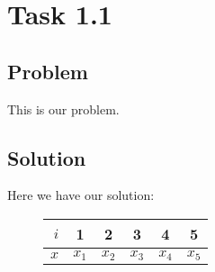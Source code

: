 \section*{Task 1.1}
\subsection*{Problem}
This is our problem.

\subsection*{Solution}
Here we have our solution:

\begin{figure}[H]
	\centering
	\begin{tabular}{ r | c c c c c}
		$i$ & 1 & 2 & 3 & 4 & 5\\
		\hline
		$x$ & $x_{1}$ & $x_{2}$ & $x_{3}$ & $x_{4}$ & $x_{5}$\\
	\end{tabular}
\end{figure}